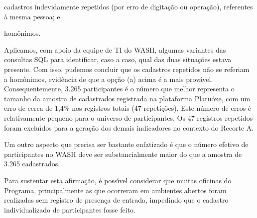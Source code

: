\documentclass[
12pt,		%
openright,	%
twoside,  %
a4paper,			%
chapter=TITLE,		%
english,			%
french,				%
spanish,			%
brazil				%
]{USPSC-classe/USPSC}
\begin{document}
\begin{alineas}
\item cadastros indevidamente repetidos (por erro de digita\c{c}\~ao ou opera\c{c}\~ao), referentes \`a mesma pessoa; e
\item hom\^onimos.
\end{alineas}

Aplicamos, com apoio da equipe de TI do WASH, algumas variantes das consultas SQL para identificar, caso a caso, qual das duas situa\c{c}\~oes estava presente. Com isso, pudemos concluir que os cadastros repetidos n\~ao se referiam a hom\^onimos, evid\^encia de que a op\c{c}\~ao (a) acima \'e a mais prov\'avel. Consequentemente, 3.265 participantes \'e o n\'umero que melhor representa o tamanho da amostra de cadastrados registrada na plataforma Platu\'oxe,  com um erro de cerca de 1,4\% nos registros totais (47 repeti\c{c}\~oes). Este n\'umero de erros \'e relativamente pequeno para o universo de participantes. Os 47 registros repetidos foram exclu\'{\i}dos para a gera\c{c}\~ao dos demais indicadores no contexto do Recorte A.


















\noindent\begin{center}\mbox{\centering{}}\end{center}


Um outro aspecto que precisa ser bastante enfatizado \'e que o n\'umero efetivo de participantes no WASH deve ser substancialmente maior do que a amostra de 3.265 cadastrados.

















Para sustentar esta afirma\c{c}\~ao, \'e poss\'{\i}vel considerar que muitas oficinas do Programa, principalmente as que ocorreram em ambientes abertos foram realizadas sem registro de presen\c{c}a  de entrada, impedindo que o cadastro individualizado de participantes fosse feito.
\end{document}
